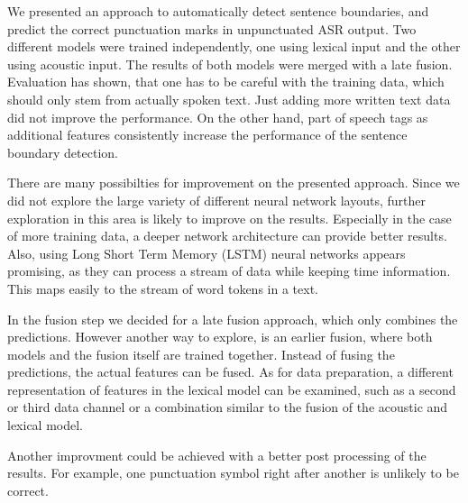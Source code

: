 We presented an approach to automatically detect sentence boundaries, and predict the correct punctuation marks in unpunctuated ASR output.
Two different models were trained independently, one using lexical input and the other using acoustic input.
The results of both models were merged with a late fusion.
Evaluation has shown, that one has to be careful with the training data, which should only stem from actually spoken text.
Just adding more written text data did not improve the performance.
On the other hand, part of speech tags as additional features consistently increase the performance of the sentence boundary detection.

There are many possibilties for improvement on the presented approach.
Since we did not explore the large variety of different neural network layouts, further exploration in this area is likely to improve on the results.
Especially in the case of more training data, a deeper network architecture can provide better results.
Also, using Long Short Term Memory (LSTM) neural networks appears promising, as they can process a stream of data while keeping time information.
This maps easily to the stream of word tokens in a text.

In the fusion step we decided for a late fusion approach, which only combines the predictions.
However another way to explore, is an earlier fusion, where both models and the fusion itself are trained together.
Instead of fusing the predictions, the actual features can be fused.
As for data preparation, a different representation of features in the lexical model can be examined, such as a second or third data channel or a combination similar to the fusion of the acoustic and lexical model.

Another improvment could be achieved with a better post processing of the results.
For example, one punctuation symbol right after another is unlikely to be correct.
